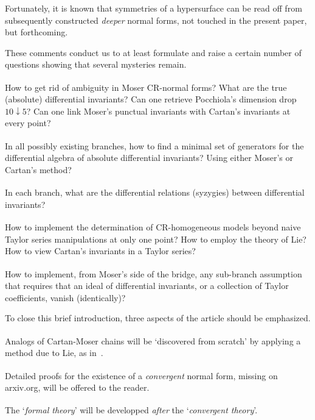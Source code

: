 \documentclass[12pt,twoside,leqno,openany]{amsart}
\begin{document}
Fortunately, it is known that 
symmetries of a hypersurface can be read off
from subsequently constructed {\em deeper} normal forms,
not touched in the present paper, but forthcoming.

These comments conduct us to at least formulate and raise
a certain number of questions showing
that several mysteries remain. 

\medskip{}\textsuperscript{}
How to get rid of ambiguity in Moser CR-normal forms?
What are the true (absolute) differential invariants?
Can one retrieve Pocchiola's dimension drop $10 \downarrow 5$?
Can one link Moser's punctual invariants with Cartan's
invariants at every point?

\medskip{}\textsuperscript{}
In all possibly existing branches, how to find a minimal
set of generators for the differential algebra of absolute
differential invariants? Using either Moser's or Cartan's method?

\medskip{}\textsuperscript{}
In each branch, what are the differential relations
(syzygies) between differential invariants?

\medskip{}\textsuperscript{}
How to implement the determination of CR-homogeneous
models beyond naive Taylor series manipulations at only one point?
How to employ the theory of Lie? How to view
Cartan's invariants in a Taylor series?

\medskip{}\textsuperscript{}
How to implement, from Moser's side of the bridge,
any sub-branch assumption that requires that an ideal
of differential invariants, or a collection of Taylor coefficients,
vanish (identically)?

\medskip

To close this brief introduction, 
three aspects of the article should be emphasized.

\medskip{}\textsuperscript{\!\!}
Analogs of Cartan-Moser chains will be `discovered from scratch'
by applying a method due to Lie, as in~{\cite{Merker-2020}}.

\medskip{}\textsuperscript{\!\!}
Detailed proofs for the existence of a {\em convergent} normal form,
missing on arxiv.org, will be offered to the reader.

\medskip{}\textsuperscript{\!\!}
The `{\sl formal theory}' will be developped {\em after} the
`{\sl convergent theory}'. 
\end{document}
